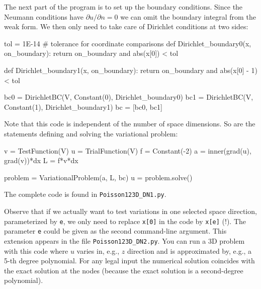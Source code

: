 The next part of the program is to set up the boundary conditions.
Since the Neumann conditions have $\partial u/\partial n=0$ we can
omit the boundary integral from the weak form. We then only
need to take care of Dirichlet conditions at two sides:
\begin{python}
tol = 1E-14   # tolerance for coordinate comparisons
def Dirichlet_boundary0(x, on_boundary):
    return on_boundary and abs(x[0]) < tol

def Dirichlet_boundary1(x, on_boundary):
    return on_boundary and abs(x[0] - 1) < tol

bc0 = DirichletBC(V, Constant(0), Dirichlet_boundary0)
bc1 = DirichletBC(V, Constant(1), Dirichlet_boundary1)
bc = [bc0, bc1]
\end{python}
Note that this code is independent of the number of space dimensions.
So are the statements defining and solving
the variational problem:
\begin{python}
v = TestFunction(V)
u = TrialFunction(V)
f = Constant(-2)
a = inner(grad(u), grad(v))*dx
L = f*v*dx

problem = VariationalProblem(a, L, bc)
u = problem.solve()
\end{python}
The complete code is found in {\fontsize{10pt}{10pt}\verb!Poisson123D_DN1.py!}.

Observe that if we actually want to test variations in one selected
space direction, parameterized by {\fontsize{10pt}{10pt}\texttt{e}}, we only need to
replace {\fontsize{10pt}{10pt}\texttt{x[0]}} in the code by {\fontsize{10pt}{10pt}\texttt{x[e]}} (!). The parameter
{\fontsize{10pt}{10pt}\texttt{e}} could be given as the second command-line argument.
This extension appears in the file {\fontsize{10pt}{10pt}\verb!Poisson123D_DN2.py!}.
You can run a 3D problem with this code where $u$ varies in, e.g.,
$z$ direction and is approximated by, e.g., a 5-th degree polynomial.
For any legal input the numerical solution coincides with the
exact solution at the nodes (because the exact solution is a second-degree
polynomial).


%
%


